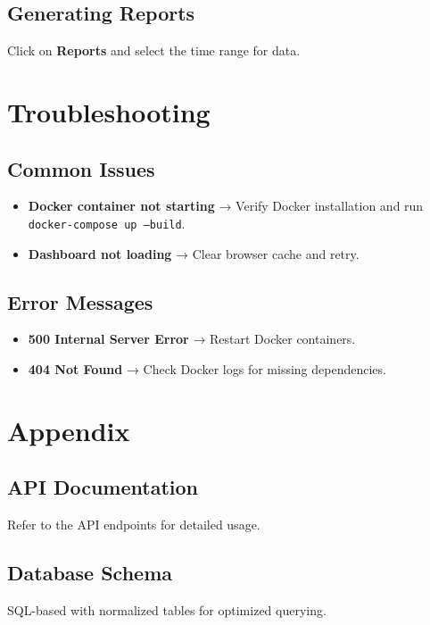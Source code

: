 \documentclass{article}
\begin{document}
\subsection{Generating Reports}
Click on \textbf{Reports} and select the time range for data.

\section{Troubleshooting}
\subsection{Common Issues}
\begin{itemize}
\item \textbf{Docker container not starting} → Verify Docker installation and run \texttt{docker-compose up --build}.
\item \textbf{Dashboard not loading} → Clear browser cache and retry.
\end{itemize}

\subsection{Error Messages}
\begin{itemize}
\item \textbf{500 Internal Server Error} → Restart Docker containers.
\item \textbf{404 Not Found} → Check Docker logs for missing dependencies.
\end{itemize}

\section{Appendix}
\subsection{API Documentation}
Refer to the API endpoints for detailed usage.

\subsection{Database Schema}
SQL-based with normalized tables for optimized querying.
\end{document}
